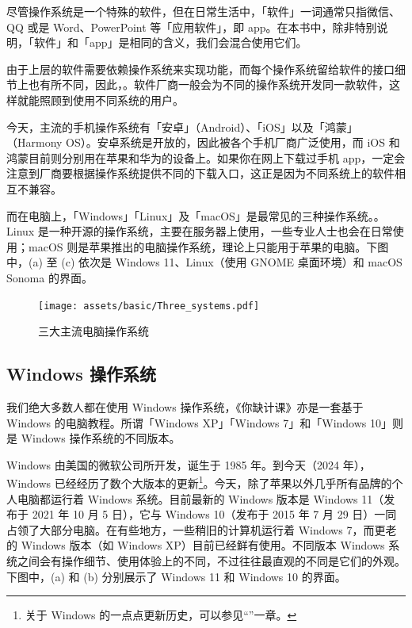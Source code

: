 \begin{note}
  尽管操作系统是一个特殊的软件，但在日常生活中，「软件」一词通常只指微信、QQ 或是 Word、PowerPoint 等「应用软件」，即 app。在本书中，除非特别说明，「软件」和「app」是相同的含义，我们会混合使用它们。
\end{note}

由于上层的软件需要依赖操作系统来实现功能，而每个操作系统留给软件的接口细节上也有所不同，因此，。软件厂商一般会为不同的操作系统开发同一款软件，这样就能照顾到使用不同系统的用户。

今天，主流的手机操作系统有「安卓」（Android）、「iOS」以及「鸿蒙」（Harmony OS）。安卓系统是开放的，因此被各个手机厂商广泛使用，而 iOS 和鸿蒙目前则分别用在苹果和华为的设备上。如果你在网上下载过手机 app，一定会注意到厂商要根据操作系统提供不同的下载入口，这正是因为不同系统上的软件相互不兼容。

而在电脑上，「Windows」「Linux」及「macOS」是最常见的三种操作系统。。Linux 是一种开源的操作系统，主要在服务器上使用，一些专业人士也会在日常使用；macOS 则是苹果推出的电脑操作系统，理论上只能用于苹果的电脑。下图中，(a) 至 (c) 依次是 Windows 11、Linux（使用 GNOME 桌面环境）和 macOS Sonoma 的界面。

\begin{figure}[htb!]
  \centering
  \texttt{[image: assets/basic/Three\_systems.pdf]}
  \caption{三大主流电脑操作系统}
  \label{fig:Three_systems}
\end{figure}

\subsection{Windows 操作系统}

我们绝大多数人都在使用 Windows 操作系统，《你缺计课》亦是一套基于 Windows 的电脑教程。所谓「Windows XP」「Windows 7」和「Windows 10」则是 Windows 操作系统的不同版本。

Windows 由美国的微软公司所开发，诞生于 1985 年。到今天（2024 年），Windows 已经经历了数个大版本的更新\footnote{关于 Windows 的一点点更新历史，可以参见“”一章。}。今天，除了苹果以外几乎所有品牌的个人电脑都运行着 Windows 系统。目前最新的 Windows 版本是 Windows 11（发布于 2021 年 10 月 5 日），它与 Windows 10（发布于 2015 年 7 月 29 日）一同占领了大部分电脑。在有些地方，一些稍旧的计算机运行着 Windows 7，而更老的 Windows 版本（如 Windows XP）目前已经鲜有使用。不同版本 Windows 系统之间会有操作细节、使用体验上的不同，不过往往最直观的不同是它们的外观。下图中，(a) 和 (b) 分别展示了 Windows 11 和 Windows 10 的界面。

